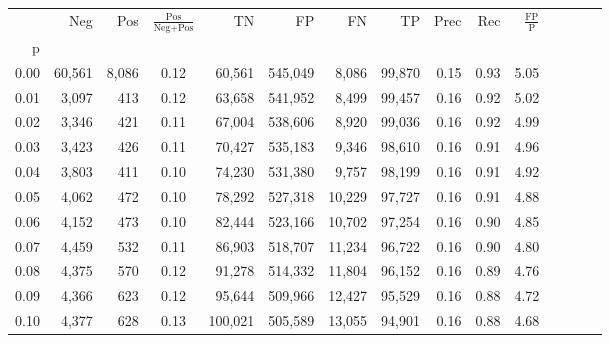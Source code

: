 \begin{tabular}{rrrcrrrrrrrrrrr}
\toprule
{} &     Neg &     Pos & $\frac{\text{Pos}}{\text{Neg}+\text{Pos}}$ &       TN &       FP &       FN &      TP &  Prec &   Rec & $\frac{\text{FP}}{\text{P}}$ \\
p    &         &         &                                            &          &          &          &         &       &       &                              \\
\midrule
0.00 &  60,561 &   8,086 &                                       0.12 &   60,561 &  545,049 &    8,086 &  99,870 &  0.15 &  0.93 &                         5.05 \\
0.01 &   3,097 &     413 &                                       0.12 &   63,658 &  541,952 &    8,499 &  99,457 &  0.16 &  0.92 &                         5.02 \\
0.02 &   3,346 &     421 &                                       0.11 &   67,004 &  538,606 &    8,920 &  99,036 &  0.16 &  0.92 &                         4.99 \\
0.03 &   3,423 &     426 &                                       0.11 &   70,427 &  535,183 &    9,346 &  98,610 &  0.16 &  0.91 &                         4.96 \\
0.04 &   3,803 &     411 &                                       0.10 &   74,230 &  531,380 &    9,757 &  98,199 &  0.16 &  0.91 &                         4.92 \\
0.05 &   4,062 &     472 &                                       0.10 &   78,292 &  527,318 &   10,229 &  97,727 &  0.16 &  0.91 &                         4.88 \\
0.06 &   4,152 &     473 &                                       0.10 &   82,444 &  523,166 &   10,702 &  97,254 &  0.16 &  0.90 &                         4.85 \\
0.07 &   4,459 &     532 &                                       0.11 &   86,903 &  518,707 &   11,234 &  96,722 &  0.16 &  0.90 &                         4.80 \\
0.08 &   4,375 &     570 &                                       0.12 &   91,278 &  514,332 &   11,804 &  96,152 &  0.16 &  0.89 &                         4.76 \\
0.09 &   4,366 &     623 &                                       0.12 &   95,644 &  509,966 &   12,427 &  95,529 &  0.16 &  0.88 &                         4.72 \\
0.10 &   4,377 &     628 &                                       0.13 &  100,021 &  505,589 &   13,055 &  94,901 &  0.16 &  0.88 &                         4.68 \\

\end{tabular}
